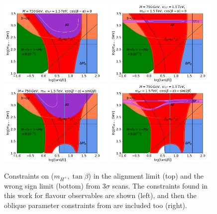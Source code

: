 \documentclass[a4paper,12pt]{article}
\begin{document}
\begin{figure}[H]
    \centering
    \includegraphics[width=0.49\textwidth]{../global/global_test3sig.png}
    \includegraphics[width=0.49\textwidth]{../global/global_test3sig1.png}
    \includegraphics[width=0.49\textwidth]{../global/global_test3sig2.png}
    \includegraphics[width=0.49\textwidth]{../global/global_test3sig3.png}
    \caption{\label{fig:threesig}Constraints on ($m_{H^+},\tan\beta$) in the alignment limit (top) and the wrong sign limit (bottom) from $3\sigma$ scans. 
    The constraints found in this work for flavour observables are shown (left), and then the oblique parameter constraints from \cite{james} are included too (right). 
}
\end{figure}
\end{document}
